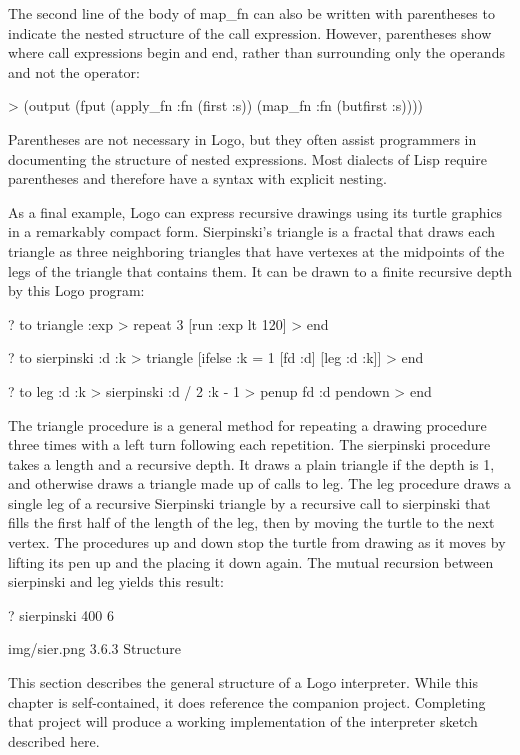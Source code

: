 \documentclass[letterpaper,10pt,dvipdfmx]{sphinxmanual}
\begin{document}
The second line of the body of map\_fn can also be written with parentheses to indicate the nested structure of the call expression. However, parentheses show where call expressions begin and end, rather than surrounding only the operands and not the operator:

\textgreater{} (output (fput (apply\_fn :fn (first :s)) (map\_fn :fn (butfirst :s))))

Parentheses are not necessary in Logo, but they often assist programmers in documenting the structure of nested expressions. Most dialects of Lisp require parentheses and therefore have a syntax with explicit nesting.

As a final example, Logo can express recursive drawings using its turtle graphics in a remarkably compact form. Sierpinski's triangle is a fractal that draws each triangle as three neighboring triangles that have vertexes at the midpoints of the legs of the triangle that contains them. It can be drawn to a finite recursive depth by this Logo program:

? to triangle :exp
\textgreater{} repeat 3 {[}run :exp lt 120{]}
\textgreater{} end

? to sierpinski :d :k
\textgreater{} triangle {[}ifelse :k = 1 {[}fd :d{]} {[}leg :d :k{]}{]}
\textgreater{} end

? to leg :d :k
\textgreater{} sierpinski :d / 2 :k - 1
\textgreater{} penup fd :d pendown
\textgreater{} end

The triangle procedure is a general method for repeating a drawing procedure three times with a left turn following each repetition. The sierpinski procedure takes a length and a recursive depth. It draws a plain triangle if the depth is 1, and otherwise draws a triangle made up of calls to leg. The leg procedure draws a single leg of a recursive Sierpinski triangle by a recursive call to sierpinski that fills the first half of the length of the leg, then by moving the turtle to the next vertex. The procedures up and down stop the turtle from drawing as it moves by lifting its pen up and the placing it down again. The mutual recursion between sierpinski and leg yields this result:

? sierpinski 400 6

img/sier.png
3.6.3   Structure

This section describes the general structure of a Logo interpreter. While this chapter is self-contained, it does reference the companion project. Completing that project will produce a working implementation of the interpreter sketch described here.
\end{document}
